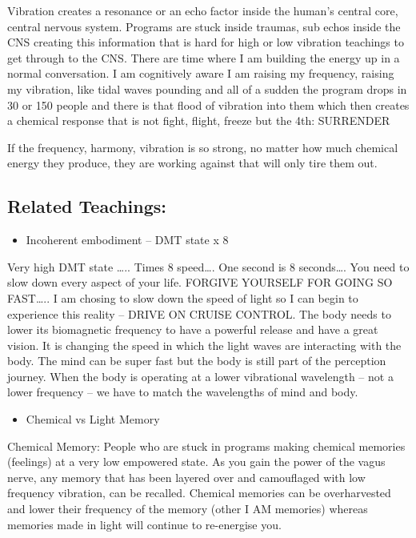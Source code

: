 Vibration creates a resonance or an echo factor inside the human's
central core, central nervous system. Programs are stuck inside traumas,
sub echos inside the CNS creating this information that is hard for high
or low vibration teachings to get through to the CNS. There are time
where I am building the energy up in a normal conversation. I am
cognitively aware I am raising my frequency, raising my vibration, like
tidal waves pounding and all of a sudden the program drops in 30 or 150
people and there is that flood of vibration into them which then creates
a chemical response that is not fight, flight, freeze but the 4th:
SURRENDER

If the frequency, harmony, vibration is so strong, no matter how much
chemical energy they produce, they are working against that will only
tire them out.

\subsection{Related Teachings:}\label{related-teachings-5}

\begin{itemize}
\tightlist
\item
  Incoherent embodiment -- DMT state x 8
\end{itemize}

Very high DMT state \ldots{}.. Times 8 speed\ldots{}. One second is 8
seconds\ldots{}. You need to slow down every aspect of your life.
FORGIVE YOURSELF FOR GOING SO FAST\ldots{}.. I am chosing to slow down
the speed of light so I can begin to experience this reality -- DRIVE ON
CRUISE CONTROL. The body needs to lower its biomagnetic frequency to
have a powerful release and have a great vision. It is changing the
speed in which the light waves are interacting with the body. The mind
can be super fast but the body is still part of the perception journey.
When the body is operating at a lower vibrational wavelength -- not a
lower frequency -- we have to match the wavelengths of mind and body.

\begin{itemize}
\tightlist
\item
  Chemical vs Light Memory
\end{itemize}

Chemical Memory: People who are stuck in programs making chemical
memories (feelings) at a very low empowered state. As you gain the power
of the vagus nerve, any memory that has been layered over and
camouflaged with low frequency vibration, can be recalled. Chemical
memories can be overharvested and lower their frequency of the memory
(other I AM memories) whereas memories made in light will continue to
re-energise you.

